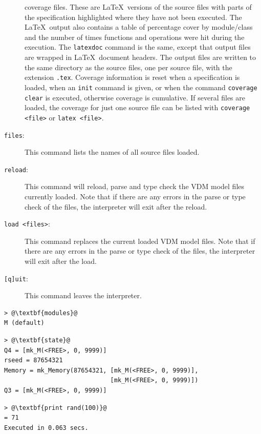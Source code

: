\documentclass{overturerepchap}
\begin{document}
\begin{description}
  coverage files. These are \LaTeX\ versions of the source files
  with parts of the
  specification highlighted where they have not been executed. The
  \LaTeX\ output also contains a table of percentage cover by
  module/class and the number of times functions and operations were
  hit during the execution. The \texttt{latexdoc} command is the same,
  except that output files are wrapped in \LaTeX\ document headers. The
  output files are written to the same directory as the source files, one
  per source file, with the extension \texttt{.tex}. Coverage
  information is reset when a specification is loaded, when an \texttt{init}
  command is given, or when the
  command \texttt{coverage clear} is executed, otherwise coverage is
  cumulative. If several files are loaded, the coverage for just one
  source file can be listed with \texttt{coverage <file>} or
  \texttt{latex <file>}. 
\item[\texttt{files}:] This command lists the names of all source files loaded.
\item[\texttt{reload}:] This command will reload, parse and type check the
  VDM model files currently loaded. Note that if there are any errors
  in the parse or type check of the files, the interpreter will exit
  after the reload.
\item[\texttt{load <files>}:] This command replaces the current loaded VDM
  model files. Note that if there are any errors in the parse or type
  check of the files, the interpreter will exit after
  the load.
\item[\texttt{[q]uit}:] This command leaves the
  interpreter.
\end{description}

\begin{lstlisting}[escapechar=@]
> @\textbf{modules}@
M (default)
\end{lstlisting}

\begin{lstlisting}[escapechar=@]
> @\textbf{state}@
Q4 = [mk_M(<FREE>, 0, 9999)]
rseed = 87654321
Memory = mk_Memory(87654321, [mk_M(<FREE>, 0, 9999)],
                             [mk_M(<FREE>, 0, 9999)])
Q3 = [mk_M(<FREE>, 0, 9999)]
\end{lstlisting}

\begin{lstlisting}[escapechar=@]
> @\textbf{print rand(100)}@
= 71
Executed in 0.063 secs.
\end{lstlisting}
\end{document}
